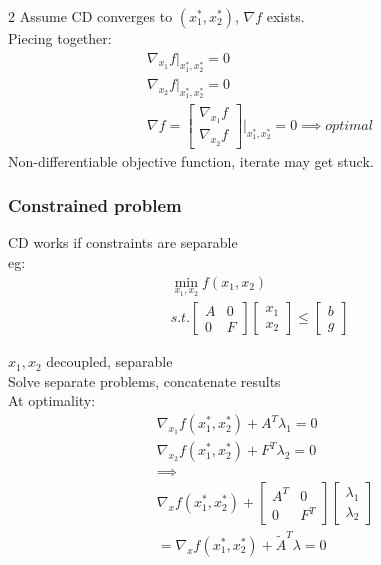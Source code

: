 \documentclass[8pt]{extarticle}
\begin{document}
\begin{multicols*}{2}
  Assume CD converges to $(x_1^*,x_2^*)$, $\nabla f$ exists.\\
  Piecing together:
  \begin{align*}
    \nabla_{x_1} f|_{x_1^*,x_2^*} = 0\\
    \nabla_{x_2} f|_{x_1^*,x_2^*} = 0\\
    \nabla f =
    \begin{bmatrix}
      \nabla_{x_1} f\\
      \nabla_{x_2} f
    \end{bmatrix}\bigg|_{x_1^*,x_2^*} = 0 \implies optimal
  \end{align*}
  Non-differentiable objective function, iterate may get stuck.
  \subsubsection{Constrained problem}
  CD works if constraints are separable\\
  eg:
  \begin{align*}
    \min_{x_1,x_2} f(x_1,x_2)\\
    s.t. 
    \begin{bmatrix}
      A & 0\\
      0 & F
    \end{bmatrix}
    \begin{bmatrix}
      x_1\\x_2
    \end{bmatrix} \leq
    \begin{bmatrix}
      b\\
      g
    \end{bmatrix}
  \end{align*}

  $x_1,x_2$ decoupled, separable\\
  Solve separate problems, concatenate results\\

  At optimality:\\
  \begin{align*}
    &\nabla_{x_1} f(x_1^*,x_2^*) + A^T \lambda_1 = 0\\
    &\nabla_{x_2} f(x_1^*,x_2^*) + F^T \lambda_2 = 0\\
    &\implies\\
    &\nabla_x f(x_1^*,x_2^*) +
    \begin{bmatrix}
      A^T & 0 \\
      0 & F^T
    \end{bmatrix}
    \begin{bmatrix}
      \lambda_1\\
      \lambda_2
    \end{bmatrix}\\
    & = \nabla_x f(x_1^*,x_2^*) + \tilde{A}^T \lambda = 0
  \end{align*}


\end{multicols*}
\end{document}
